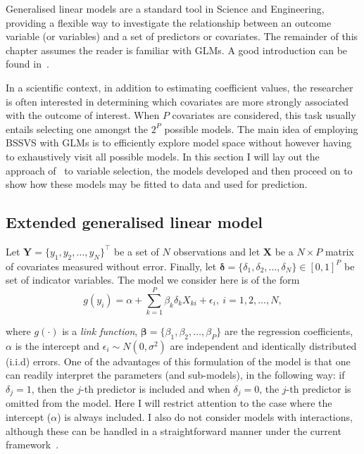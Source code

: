 Generalised  linear models are a standard tool in Science and Engineering, providing a flexible way to investigate the relationship between an outcome variable (or variables) and a set of predictors or covariates.
The remainder of this chapter assumes the reader is familiar with GLMs.
A good introduction can be found in~\cite{Mccullagh1983}.

In a scientific context, in addition to estimating coefficient values, the researcher is often interested in determining which covariates are more strongly associated with the outcome of interest.
When $P$ covariates are considered, this task usually entails selecting one amongst the $2^P$ possible models.
The main idea of employing BSSVS with GLMs is to efficiently explore model space without however having to exhaustively visit all possible models.
In this section I will lay out the approach of~\cite{Kuo1998} to variable selection, the models developed and then proceed on to show how these models may be fitted to data and used for prediction.

\subsection{Extended generalised linear model}
\label{sec:eglm}

Let $\mathbf{Y} = \{y_1, y_2, \ldots, y_N\}^\intercal$ be a set of $N$ observations and let $\mathbf{X}$ be a $N \times P$ matrix of covariates measured without error.
Finally, let $\boldsymbol\delta = \{\delta_1, \delta_2, \ldots, \delta_N \} \in [0, 1]^P$ be set of indicator variables.
The model we consider here is of the form
\begin{equation}
 \label{eq:eglm}
 g(y_i) = \alpha + \sum_{k=1}^P \beta_k\delta_k X_{ki} + \epsilon_i, \: i=1, 2, \ldots, N, 
\end{equation}

where $g(\cdot)$ is a \textit{link function}, $\boldsymbol\beta = \{ \beta_1, \beta_2, \ldots, \beta_P\}$ are the regression coefficients, $\alpha$ is the intercept and $\epsilon_i \sim N(0, \sigma^2)$ are independent and identically distributed (i.i.d) errors.
One of the advantages of this formulation of the model is that one can readily interpret the parameters (and sub-models), in the following way: if $\delta_j = 1$, then the $j$-th predictor is included and when $\delta_j = 0$, the $j$-th predictor is omitted from the model.
Here I will restrict attention to the case where the intercept ($\alpha$) is always included.
I also do not consider models with interactions, although these can be handled in a straightforward manner under the current framework~\citep[Eq. 1.2]{Kuo1998}.

